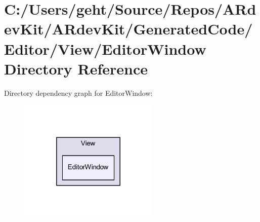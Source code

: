 \section{C\-:/\-Users/geht/\-Source/\-Repos/\-A\-Rdev\-Kit/\-A\-Rdev\-Kit/\-Generated\-Code/\-Editor/\-View/\-Editor\-Window Directory Reference}
\label{dir_bb1ff3dc90fcf07e3e557067d38f2410}
Directory dependency graph for Editor\-Window\-:
\nopagebreak
\begin{figure}[H]
\begin{center}
\leavevmode
\includegraphics[width=190pt]{dir_bb1ff3dc90fcf07e3e557067d38f2410_dep}
\end{center}
\end{figure}
